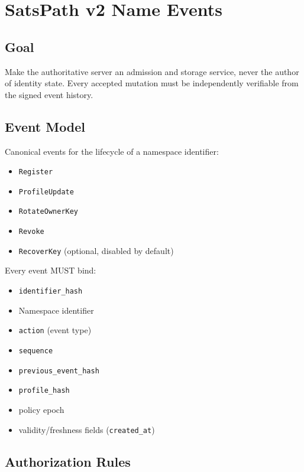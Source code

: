 \documentclass[
]{article}
\author{}
\date{}
\providecommand{\tightlist}{%
  \setlength{\itemsep}{0pt}\setlength{\parskip}{0pt}}
\begin{document}
\hypertarget{satspath-v2-name-events}{%
\section{SatsPath v2 Name Events}\label{satspath-v2-name-events}}

\hypertarget{goal}{%
\subsection{Goal}\label{goal}}

Make the authoritative server an admission and storage service, never
the author of identity state. Every accepted mutation must be
independently verifiable from the signed event history.

\hypertarget{event-model}{%
\subsection{Event Model}\label{event-model}}

Canonical events for the lifecycle of a namespace identifier:

\begin{itemize}
\tightlist
\item
  \texttt{Register}
\item
  \texttt{ProfileUpdate}
\item
  \texttt{RotateOwnerKey}
\item
  \texttt{Revoke}
\item
  \texttt{RecoverKey} (optional, disabled by default)
\end{itemize}

Every event MUST bind:

\begin{itemize}
\tightlist
\item
  \texttt{identifier\_hash}
\item
  Namespace identifier
\item
  \texttt{action} (event type)
\item
  \texttt{sequence}
\item
  \texttt{previous\_event\_hash}
\item
  \texttt{profile\_hash}
\item
  policy epoch
\item
  validity/freshness fields (\texttt{created\_at})
\end{itemize}

\hypertarget{authorization-rules}{%
\subsection{Authorization Rules}\label{authorization-rules}}
\end{document}
